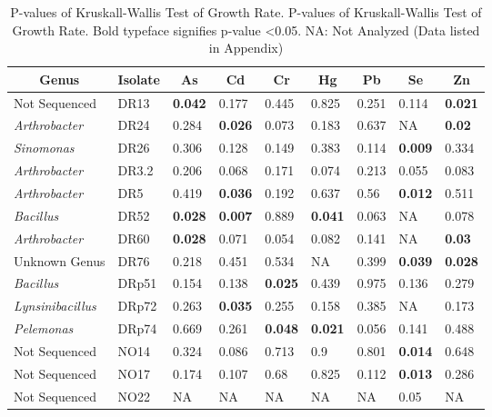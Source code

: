 \documentclass[ms, hidelinks]{uncgdissertationexp3}
\theoremstyle{plain}
\theoremstyle{definition}
\theoremstyle{remark}
\newcommand{\titlecaption}[2]{\caption[#1]{#1. #2}}
\begin{document}
\begin{table}
  \titlecaption{P-values of Kruskall-Wallis Test of Growth Rate}{P-values of Kruskall-Wallis Test of Growth Rate. Bold typeface signifies p-value <0.05. NA: Not Analyzed (Data listed in Appendix)}
  \label{tab:muvalue}
  \centering
  \begin{tabular}{lllllllll}
  \toprule
  \multicolumn{1}{c}{Genus} & \multicolumn{1}{c}{Isolate} & \multicolumn{1}{c}{As} & \multicolumn{1}{c}{Cd} & \multicolumn{1}{c}{Cr} & \multicolumn{1}{c}{Hg} & \multicolumn{1}{c}{Pb} & \multicolumn{1}{c}{Se} & \multicolumn{1}{c}{Zn}\\
  \midrule
  \rowcolor{gray!6}  Not Sequenced & DR13 & \textbf{0.042} & 0.177 & 0.445 & 0.825 & 0.251 & 0.114 & \textbf{0.021}\\
  \em{Arthrobacter} & DR24 & 0.284 & \textbf{0.026} & 0.073 & 0.183 & 0.637 & NA & \textbf{0.02}\\
  \rowcolor{gray!6}  \em{Sinomonas} & DR26 & 0.306 & 0.128 & 0.149 & 0.383 & 0.114 & \textbf{0.009} & 0.334\\
  \em{Arthrobacter} & DR3.2 & 0.206 & 0.068 & 0.171 & 0.074 & 0.213 & 0.055 & 0.083\\
  \rowcolor{gray!6}  \em{Arthrobacter} & DR5 & 0.419 & \textbf{0.036} & 0.192 & 0.637 & 0.56 & \textbf{0.012} & 0.511\\
  \em{Bacillus} & DR52 & \textbf{0.028} & \textbf{0.007} & 0.889 & \textbf{0.041} & 0.063 & NA & 0.078\\
  \rowcolor{gray!6}  \em{Arthrobacter} & DR60 & \textbf{0.028} & 0.071 & 0.054 & 0.082 & 0.141 & NA & \textbf{0.03}\\
  Unknown Genus & DR76 & 0.218 & 0.451 & 0.534 & NA & 0.399 & \textbf{0.039} & \textbf{0.028}\\
  \rowcolor{gray!6}  \em{Bacillus} & DRp51 & 0.154 & 0.138 & \textbf{0.025} & 0.439 & 0.975 & 0.136 & 0.279\\
  \em{Lynsinibacillus} & DRp72 & 0.263 & \textbf{0.035} & 0.255 & 0.158 & 0.385 & NA & 0.173\\
  \rowcolor{gray!6}  \em{Pelemonas} & DRp74 & 0.669 & 0.261 & \textbf{0.048} & \textbf{0.021} & 0.056 & 0.141 & 0.488\\
  Not Sequenced & NO14 & 0.324 & 0.086 & 0.713 & 0.9 & 0.801 & \textbf{0.014} & 0.648\\
  \rowcolor{gray!6}  Not Sequenced & NO17 & 0.174 & 0.107 & 0.68 & 0.825 & 0.112 & \textbf{0.013} & 0.286\\
  Not Sequenced & NO22 & NA & NA & NA & NA & NA & 0.05 & NA\\
  \bottomrule
  \end{tabular}
  \vspace{18pt}
\end{table}
\end{document}
